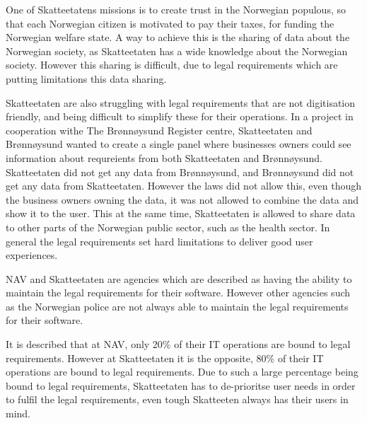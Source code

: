 One of Skatteetatens missions is to create trust in the Norwegian populous, so that each Norwegian citizen is motivated to pay their taxes, for funding the Norwegian welfare state. A way to achieve this is the sharing of data about the Norwegian society, as Skatteetaten has a wide knowledge about the Norwegian society. However this sharing is difficult, due to legal requirements which are putting limitations this data sharing.

Skatteetaten are also struggling with legal requirements that are not digitisation friendly, and being difficult to simplify these for their operations. In a project in cooperation withe The Brønnøysund Register centre, Skatteetaten and Brønnøysund wanted to create a single panel where businesses owners could see information about requreients from both Skatteetaten and Brønnøysund. Skatteetaten did not get any data from Brønnøysund, and Brønnøysund did not get any data from Skatteetaten. However the laws did not allow this, even though the business owners owning the data, it was not allowed to combine the data and show it to the user. This at the same time, Skatteetaten is allowed to share data to other parts of the Norwegian public sector, such as the health sector. In general the legal requirements set hard limitations to deliver good user experiences.

NAV and Skatteetaten are agencies which are described as having the ability to maintain the legal requirements for their software. However other agencies such as the Norwegian police are not always able to maintain the legal requirements for their software.

It is described that at NAV, only 20\% of their IT operations are bound to legal requirements. However at Skatteetaten it is the opposite, 80\% of their IT operations are bound to legal requirements. Due to such a large percentage being bound to legal requirements, Skatteetaten has to de-prioritse user needs in order to fulfil the legal requirements, even tough Skatteeten always has their users in mind.



